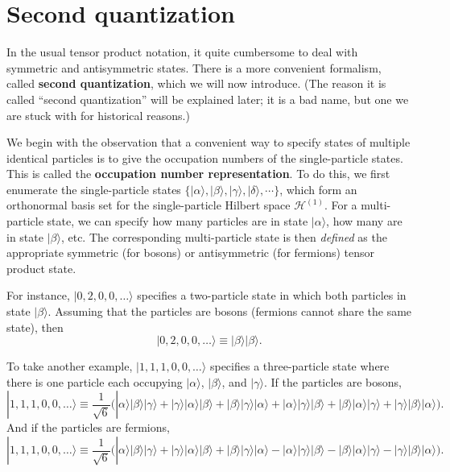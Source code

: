 \documentclass[pra,12pt]{revtex4}
\begin{document}
\section{Second quantization}

In the usual tensor product notation, it quite cumbersome to deal with
symmetric and antisymmetric states.  There is a more convenient
formalism, called \textbf{second quantization}, which we will now
introduce.  (The reason it is called ``second quantization'' will be
explained later; it is a bad name, but one we are stuck with for
historical reasons.)

We begin with the observation that a convenient way to specify states
of multiple identical particles is to give the occupation numbers of
the single-particle states.  This is called the \textbf{occupation
  number representation}.  To do this, we first enumerate the
single-particle states $\{|\alpha\rangle, |\beta\rangle, |\gamma\rangle, |\delta\rangle,
\cdots\}$, which form an orthonormal basis set for the single-particle
Hilbert space $\mathscr{H}^{(1)}$.  For a multi-particle state, we can
specify how many particles are in state $|\alpha\rangle$, how many are in
state $|\beta\rangle$, etc.  The corresponding multi-particle state is
then \textit{defined} as the appropriate symmetric (for bosons) or
antisymmetric (for fermions) tensor product state.

For instance, $|0,2,0,0,\dots\rangle$ specifies a two-particle state
in which both particles in state $|\beta\rangle$.  Assuming that the
particles are bosons (fermions cannot share the same state), then
$$|0,2,0,0,\dots\rangle \equiv |\beta\rangle|\beta\rangle.$$

To take another example, $|1,1,1,0,0,\dots\rangle$ specifies a
three-particle state where there is one particle each occupying
$|\alpha\rangle$, $|\beta\rangle$, and $|\gamma\rangle$.  If the particles are
bosons,
$$|1,1,1,0,0,\dots\rangle \equiv \frac{1}{\sqrt{6}}\Big(|\alpha\rangle|\beta\rangle|\gamma\rangle + |\gamma\rangle|\alpha\rangle|\beta\rangle + |\beta\rangle|\gamma\rangle|\alpha\rangle + |\alpha\rangle|\gamma\rangle|\beta\rangle + |\beta\rangle|\alpha\rangle|\gamma\rangle + |\gamma\rangle|\beta\rangle|\alpha\rangle \Big).$$
And if the particles are fermions,
$$|1,1,1,0,0,\dots\rangle \equiv \frac{1}{\sqrt{6}} \Big(|\alpha\rangle|\beta\rangle|\gamma\rangle + |\gamma\rangle|\alpha\rangle|\beta\rangle + |\beta\rangle|\gamma\rangle|\alpha\rangle - |\alpha\rangle|\gamma\rangle|\beta\rangle - |\beta\rangle|\alpha\rangle|\gamma\rangle - |\gamma\rangle|\beta\rangle|\alpha\rangle\Big).$$
\end{document}
